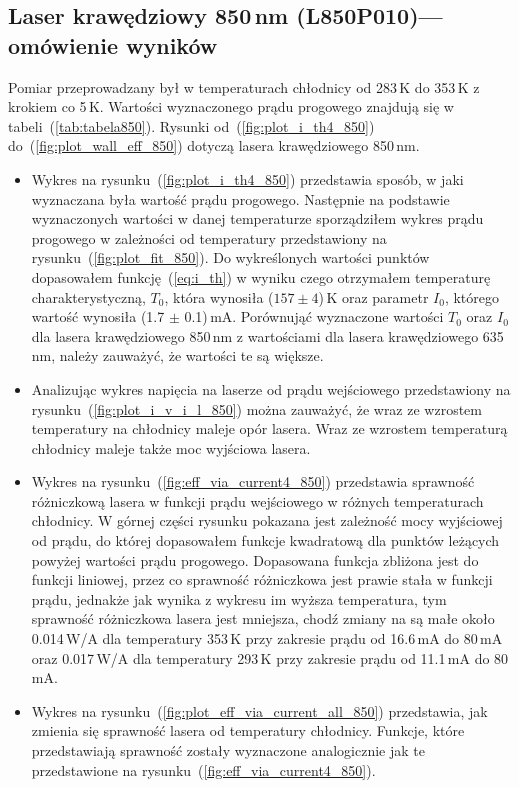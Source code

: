 \subsection{Laser krawędziowy 850\,nm (L850P010)--- omówienie wyników}
Pomiar przeprowadzany był w temperaturach chłodnicy od 283\,K do 353\,K z krokiem co 5\,K. Wartości wyznaczonego prądu progowego
znajdują się w tabeli~(\ref{tab:tabela850}). Rysunki od~(\ref{fig:plot_i_th4_850}) do~(\ref{fig:plot_wall_eff_850}) dotyczą lasera
krawędziowego 850\,nm.
\begin{itemize}
\item Wykres na rysunku~(\ref{fig:plot_i_th4_850}) przedstawia sposób, w jaki wyznaczana była wartość prądu progowego. Następnie na podstawie
wyznaczonych wartości w danej temperaturze sporządziłem wykres prądu progowego w zależności od temperatury
przedstawiony na rysunku~(\ref{fig:plot_fit_850}). Do wykreślonych wartości punktów dopasowałem funkcję~(\ref{eq:i_th}) w wyniku czego otrzymałem
temperaturę charakterystyczną, $T_0$, która wynosiła ($157 \pm 4$)\,K oraz parametr $I_0$, którego wartość wynosiła (1.7 $\pm$ 0.1)\,mA.
Porównująć wyznaczone wartości $T_0$ oraz $I_0$ dla lasera krawędziowego 850\,nm z wartościami dla lasera krawędziowego 635\,nm, należy
zauważyć, że wartości te są większe.
\item Analizując wykres napięcia na laserze od prądu wejściowego przedstawiony na rysunku~(\ref{fig:plot_i_v_i_l_850})
można zauważyć, że wraz ze wzrostem temperatury na chłodnicy
maleje opór lasera. Wraz ze wzrostem temperaturą chłodnicy maleje także moc wyjściowa lasera.
\item Wykres na rysunku~(\ref{fig:eff_via_current4_850}) przedstawia sprawność różniczkową lasera w funkcji prądu wejściowego
w różnych temperaturach chłodnicy. W górnej części rysunku pokazana jest zależność mocy wyjściowej od prądu, do której dopasowałem
funkcje kwadratową dla punktów leżących powyżej wartości prądu progowego. Dopasowana funkcja zbliżona jest do funkcji liniowej, przez co sprawność różniczkowa jest
prawie stała w funkcji prądu, jednakże jak wynika z wykresu im wyższa temperatura, tym sprawność różniczkowa lasera jest mniejsza, chodź zmiany na
są małe około 0.014\,W/A dla temperatury 353\,K przy zakresie prądu od 16.6\,mA do 80\,mA oraz 0.017\,W/A dla temperatury 293\,K
przy zakresie prądu od 11.1\,mA do 80\,mA.
\item Wykres na rysunku~(\ref{fig:plot_eff_via_current_all_850}) przedstawia, jak zmienia się sprawność lasera od temperatury chłodnicy.
Funkcje, które przedstawiają sprawność zostały wyznaczone analogicznie jak te przedstawione na rysunku~(\ref{fig:eff_via_current4_850}).

\end{itemize}
